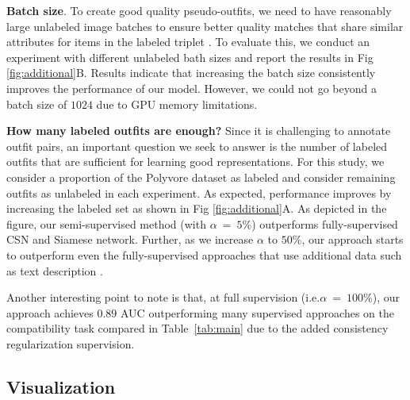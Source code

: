 \documentclass[sigconf]{acmart}
\newcommand{\ie}{i.e.}
\begin{document}
\vspace{1mm}
\noindent \textbf{Batch size}. To create good quality pseudo-outfits, we need to have reasonably large unlabeled image batches to ensure better quality matches that share similar attributes for items in the labeled triplet \cite{simclr, lee2013pseudo}. To evaluate this, we conduct an experiment with different unlabeled bath sizes and report the results in Fig \ref{fig:additional}{B}. Results indicate that increasing the batch size consistently improves the performance of our model. However, we could not go beyond a batch size of $1024$ due to \textsc{GPU} memory limitations.

\vspace{1mm}
\noindent \textbf{How many labeled outfits are enough?} Since it is challenging to annotate outfit pairs, an important question we seek to answer is the number of labeled outfits that are sufficient for learning good representations. For this study, we consider a proportion of the Polyvore dataset as labeled and consider remaining outfits as unlabeled in each experiment. As expected, performance improves by increasing the labeled set as shown in Fig \ref{fig:additional}{A}. As depicted in the figure, our semi-supervised method (with $\alpha$~=~$5\%$) outperforms  fully-supervised \textsc{CSN} \cite{csn} and Siamese network. Further, as we increase $\alpha$ to $50\%$, our approach starts to outperform even the fully-supervised approaches that use additional data such as text description \cite{csn,eccv2018learning}. 

Another interesting point to note is that, at full supervision (\ie $\alpha$~=~$100\%$), our approach achieves $0.89$ \textsc{AUC} outperforming many supervised approaches on the compatibility task compared in Table~\ref{tab:main} due to the added consistency regularization supervision. 


\subsection{Visualization}
\begin{comment}
\noindent \textbf{Embedding Space}. We plot t-SNE \cite{tsne} of the visual representation space $\Phi$ for ImageNet and our model as shown in Fig. \ref{fig:tsne_a} and Fig. \ref{fig:tsne_b}. As shown in Fig. \ref{fig:tsne_a}, ImageNet pre-trained models trained for classification depicts stronger bias for learning shape discriminative features that bringing different category items farther away. This bias hampers the learning of fashion compatibility especially in a semi-supervised setting like ours as discussed in Sec. \ref{sec:l_ss}. In Fig. \ref{fig:tsne_b}, we portray the t-SNE plot of the representation space learned by our semi-supervised approach ($\alpha$~=~$5\%$). The t-SNE plot demonstrates that the embedding space has learnt strong representations for visual-appearance characterized by the color and texture information of fashion items. Hence, by explicitly disentangling the shape information of the fashion items, our approach overcomes the pre-training task bias. 
\end{comment}
\end{document}
